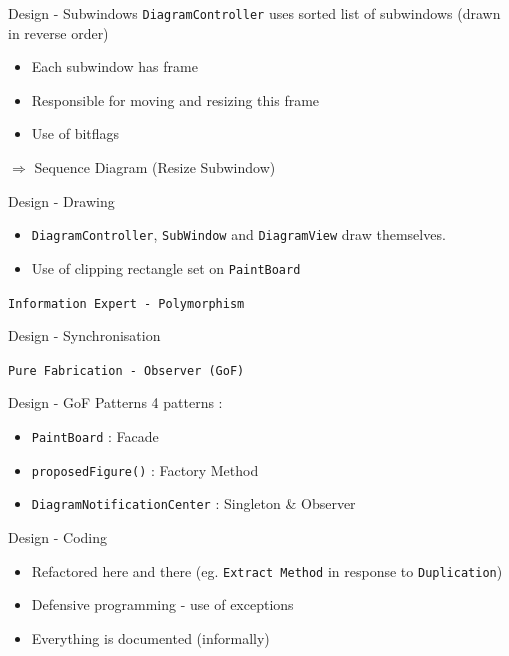 \documentclass[10pt]{beamer}
\begin{document}
\begin{frame}[fragile]{Design - Subwindows}
\texttt{DiagramController} uses sorted list of subwindows (drawn in reverse order)
\begin{itemize}
\item Each subwindow has frame
\item Responsible for moving and resizing this frame
\item Use of bitflags
\end{itemize}
$\Rightarrow$ Sequence Diagram (Resize Subwindow) 
\begin{center}
\vspace{1cm}
\end{center}
\end{frame}

\begin{frame}[fragile]{Design - Drawing}
\begin{itemize}
\item \texttt{DiagramController}, \texttt{SubWindow} and \texttt{DiagramView} draw themselves.
\item Use of clipping rectangle set on \texttt{PaintBoard}
\end{itemize}
\begin{center}
\vspace{1cm}
\texttt{Information Expert - Polymorphism}
\end{center}
\end{frame}

\begin{frame}[fragile]{Design - Synchronisation}
\begin{center}
\vspace{1cm}
\texttt{Pure Fabrication - Observer (GoF)}
\end{center}
\end{frame}

\begin{frame}[fragile]{Design - GoF Patterns}
4 patterns :
\begin{itemize}
\item \texttt{PaintBoard} : Facade
\item \texttt{proposedFigure()} : Factory Method
\item \texttt{DiagramNotificationCenter} : Singleton \& Observer
\end{itemize}
\end{frame}

\begin{frame}[fragile]{Design - Coding}
\begin{itemize}
\item Refactored here and there (eg. \texttt{Extract Method} in response to \texttt{Duplication})
\item Defensive programming - use of exceptions
\item Everything is documented (informally)
\end{itemize}
\end{frame}
\end{document}
